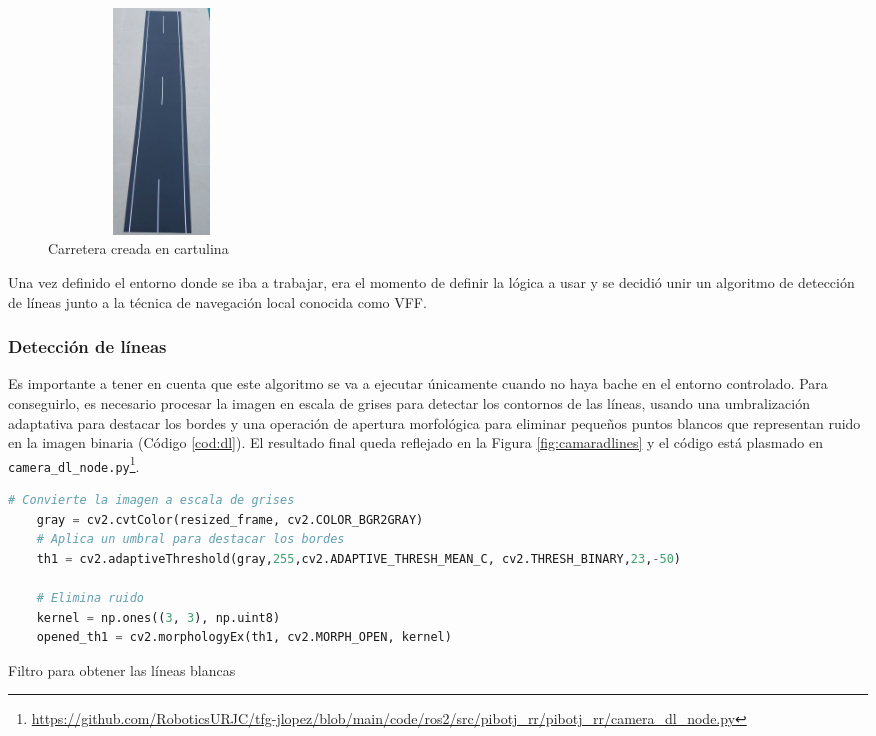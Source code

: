  \begin{figure} [h!]
	\begin{center}
		\includegraphics[width=6cm, height=6cm]{figs/cap6/carretera.png}
	\end{center}
	\caption{Carretera creada en cartulina}
	\label{fig:carreteracartulina}
\end{figure}

Una vez definido el entorno donde se iba a trabajar, era el momento de definir la lógica a usar y se decidió unir un algoritmo de detección de líneas junto a la técnica de navegación local conocida como \ac{VFF}. 

\subsubsection{Detección de líneas}
\label{subsubsec:softwaredl}

Es importante a tener en cuenta que este algoritmo se va a ejecutar únicamente cuando no haya bache en el entorno controlado. Para conseguirlo, es necesario procesar la imagen en escala de grises para detectar los contornos de las líneas, usando una umbralización adaptativa para destacar los bordes y una operación de apertura morfológica para eliminar pequeños puntos blancos que representan ruido en la imagen binaria (Código \ref{cod:dl}). El resultado final queda reflejado en la Figura \ref{fig:camaradlines} y el código está plasmado en \verb|camera_dl_node.py|\footnote{\url{https://github.com/RoboticsURJC/tfg-jlopez/blob/main/code/ros2/src/pibotj_rr/pibotj_rr/camera_dl_node.py}}.


\begin{code}[h]
	\begin{lstlisting}[language=Python]
	# Convierte la imagen a escala de grises
	gray = cv2.cvtColor(resized_frame, cv2.COLOR_BGR2GRAY)
	# Aplica un umbral para destacar los bordes
	th1 = cv2.adaptiveThreshold(gray,255,cv2.ADAPTIVE_THRESH_MEAN_C, cv2.THRESH_BINARY,23,-50)
		
	# Elimina ruido
	kernel = np.ones((3, 3), np.uint8) 
	opened_th1 = cv2.morphologyEx(th1, cv2.MORPH_OPEN, kernel)
	\end{lstlisting}
	\caption[Filtro para obtener las líneas blancas]{Filtro para obtener las líneas blancas}
	\label{cod:dl}
\end{code}


